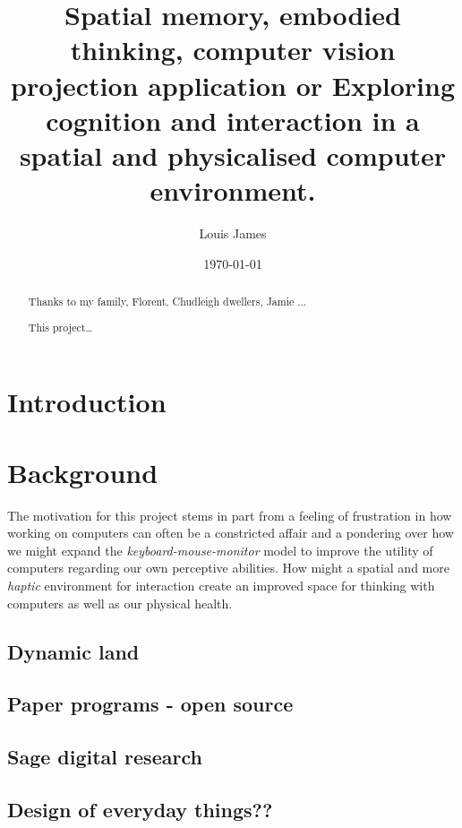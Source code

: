 \documentclass[12pt]{report}
\author{Louis James}
\date{\today}
\title{Spatial memory, embodied thinking, computer vision projection application or Exploring cognition and interaction in a spatial and physicalised computer environment.}
\begin{document}
\maketitle

\renewcommand{\abstractname}{Acknowledgements}
\begin{abstract}
 Thanks to my family, Florent, Chudleigh dwellers, Jamie ...
\end{abstract}
\newpage

\renewcommand{\abstractname}{Abstract}
\begin{abstract}
This project\ldots{}
\end{abstract}
\tableofcontents
\chapter{Introduction}
\label{sec:orge60ad95}
\chapter{Background}
\label{sec:org84a4bea}

The motivation for this project stems in part from a feeling of frustration in
how working on computers can often be a constricted affair and a pondering over
how we might expand the \emph{keyboard-mouse-monitor} model to improve the
utility of computers regarding our own perceptive abilities. How might a
spatial and more \emph{haptic} environment for interaction create an improved space for
thinking with computers as well as our physical health.

\section{Dynamic land}
\label{sec:orgb5d5f31}

\section{Paper programs - open source}
\label{sec:orgfb811a3}

\section{Sage digital research}
\label{sec:orgf96acbd}

\section{Design of everyday things??}
\label{sec:org05681f8}
\end{document}
